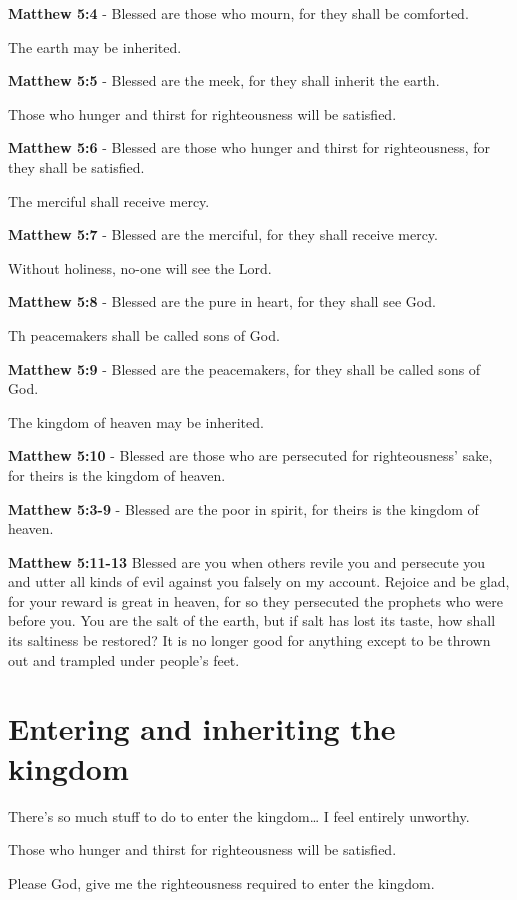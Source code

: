 \documentclass[11pt]{article}
\begin{document}
\textbf{Matthew 5:4} - Blessed are those who mourn, for they shall be comforted.

The earth may be inherited.

\textbf{Matthew 5:5} - Blessed are the meek, for they shall inherit the earth.

Those who hunger and thirst for righteousness will be satisfied.

\textbf{Matthew 5:6} - Blessed are those who hunger and thirst for righteousness, for they shall be satisfied.

The merciful shall receive mercy.

\textbf{Matthew 5:7} - Blessed are the merciful, for they shall receive mercy.

Without holiness, no-one will see the Lord.

\textbf{Matthew 5:8} - Blessed are the pure in heart, for they shall see God.

Th peacemakers shall be called sons of God.

\textbf{Matthew 5:9} - Blessed are the peacemakers, for they shall be called sons of God.

The kingdom of heaven may be inherited.

\textbf{Matthew 5:10} - Blessed are those who are persecuted for righteousness' sake, for theirs is the kingdom of heaven.

\textbf{Matthew 5:3-9} - Blessed are the poor in spirit, for theirs is the kingdom of heaven.

\textbf{Matthew 5:11-13}  Blessed are you when others revile you and persecute you and utter all kinds of evil against you falsely on my account. Rejoice and be glad, for your reward is great in heaven, for so they persecuted the prophets who were before you. You are the salt of the earth, but if salt has lost its taste, how shall its saltiness be restored? It is no longer good for anything except to be thrown out and trampled under people's feet.

\section{Entering and inheriting the kingdom}
\label{sec:org11ee95d}
There's so much stuff to do to enter the kingdom\ldots{} I feel entirely unworthy.

Those who hunger and thirst for righteousness will be satisfied.

Please God, give me the righteousness required to enter the kingdom.
\end{document}
